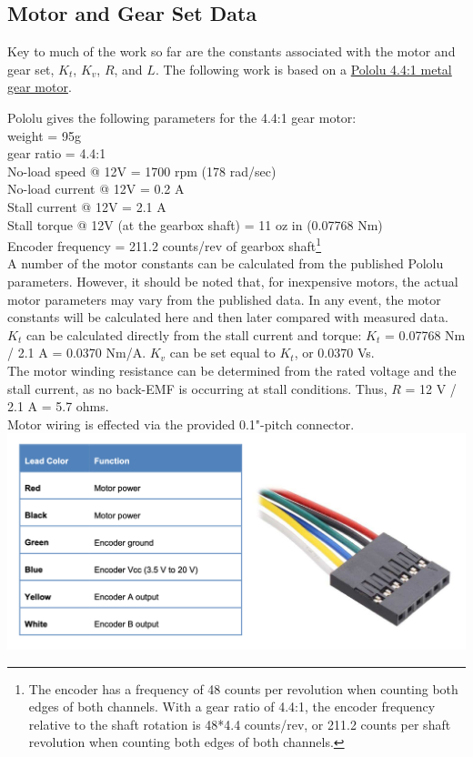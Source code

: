 \documentclass[12pt,letterpaper]{article}
\begin{document}
\begin{appendices}

\section{Motor and Gear Set Data}

Key to much of the work so far are the constants associated with the motor and gear set, $K_{t}$, $K_{v}$, $R$, and $L$.
The following work is based on a \href{https://www.pololu.com/product/3237}{Pololu  4.4:1 metal gear motor}.  

Pololu gives the following parameters for the 4.4:1 gear motor: \\
weight = 95g \\
gear ratio = 4.4:1 \\
No-load speed @ 12V = 1700 rpm (178 rad/sec)\\
No-load current @ 12V = 0.2 A \\
Stall current @ 12V = 2.1 A \\
Stall torque @ 12V (at the gearbox shaft) = 11 oz in (0.07768 Nm)\\
Encoder frequency = 211.2 counts/rev of gearbox shaft\footnote{The encoder has a frequency of 48 counts per revolution when counting both edges of both channels. With a gear ratio of 4.4:1, the encoder frequency relative to the shaft rotation is 48*4.4 counts/rev, or 211.2 counts per shaft revolution when counting both edges of both channels.}\\

A number of the motor constants can be calculated from the published Pololu parameters.  However, it
should  be noted that, for inexpensive motors, the actual motor parameters may vary from the 
published data.  In any event, the motor constants will be calculated here and then later compared
with measured data.\\

$K_{t}$ can be calculated directly from the stall current and torque: $K_{t}$ = 0.07768 Nm /  2.1 A = 
0.0370 Nm/A.  $K_{v}$ can be set equal to $K_{t}$, or 0.0370 Vs.\\

The motor winding resistance can be determined from the rated voltage and the stall current, as no back-EMF is occurring at stall
conditions.  Thus, $R$ = 12 V / 2.1 A = 5.7 ohms.\\

Motor wiring is effected via the provided 0.1"-pitch connector.
\includegraphics[width=\textwidth]{images/connector.png} 




\end{appendices}
\end{document}
